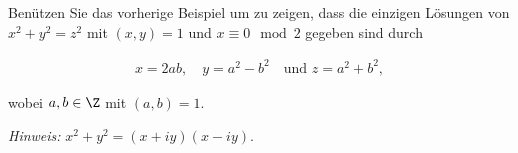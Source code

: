 
\begin{exercise}

Benützen Sie das vorherige Beispiel um zu zeigen, dass die einzigen
Lösungen von $x^2 + y^2 = z^2$ mit $(x,y) = 1$ und $x \equiv 0 \mod{2}$
gegeben sind durch

\begin{align*}
    x = 2ab, \quad y = a^2 - b^2 \quad \text{und } z = a^2 + b^2, 
\end{align*}

wobei $a,b \in \Z$ mit $(a,b) = 1$.

\textit{Hinweis:} $x^2 + y^2 = (x + iy)(x - iy)$.

\end{exercise}


\begin{solution}

\phantom{}

\end{solution}

